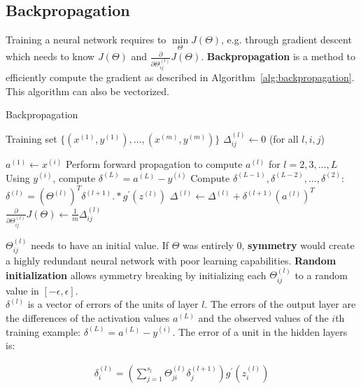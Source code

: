 \documentclass{report}
\begin{document}
\subsection{Backpropagation}
Training a neural network requires to $\min\limits_{\Theta}J(\Theta)$, e.g. through gradient descent which needs to know $J(\Theta)$ and $\frac{\partial}{\partial \Theta_{ij}^{(l)}}J(\Theta)$.
{\bf Backpropagation} is a method to efficiently compute the gradient as described in Algorithm~\ref{alg:backpropagation}. This algorithm can also be vectorized.

\begin{algorithm}[h!]
\caption{Backpropagation}
\label{alg:backpropagation}
\begin{algorithmic}
\State Training set $\{(x^{(1)},y^{(1)}),...,(x^{(m)},y^{(m)})\}$
\State $\Delta_{ij}^{(l)} \gets 0$ (for all $l,i,j$)

\State $a^{(1)} \gets x^{(i)}$
\State Perform forward propagation to compute $a^{(l)}$ for $l=2,3,...,L$
\State Using $y^{(i)}$, compute $\delta^{(L)}=a^{(L)}-y^{(i)}$ 
\State Compute $\delta^{(L-1)},\delta^{(L-2)},...,\delta^{(2)}$: $\delta^{(l)}=(\Theta^{(l)})^T\delta^{(l+1)}.*g^{'}(z^{(l)})$
\State $\Delta^{(l)} \gets \Delta^{(l)}+\delta^{(l+1)}(a^{(l)})^T$  
\EndFor
\State $\frac{\partial}{\partial \Theta_{ij}^{(l)}}J(\Theta) \gets \frac{1}{m}\Delta_{ij}^{(l)}$

\end{algorithmic}
\end{algorithm}

$\Theta_{ij}^{(l)}$ needs to have an initial value. If $\Theta$ was entirely 0, {\bf symmetry} would create a highly redundant neural network with poor learning capabilities.
{\bf Random initialization} allows symmetry breaking by initializing each $\Theta_{ij}^{(l)}$ to a random value in $[-\epsilon,\epsilon]$. \\

$\delta^{(l)}$ is a vector of errors of the units of layer $l$.
The errors of the output layer are the differences of the activation values $a^{(L)}$ and the observed values of the $i$th training example: $\delta^{(L)}=a^{(L)}-y^{(i)}$.
The error of a unit in the hidden layers is: 

\begin{align*}
\delta^{(l)}_i=(\sum_{j=1}^{s_l} \Theta_{ji}^{(l)}\delta_j^{(l+1)})g^{'}(z_i^{(l)})
\end{align*}
\end{document}
